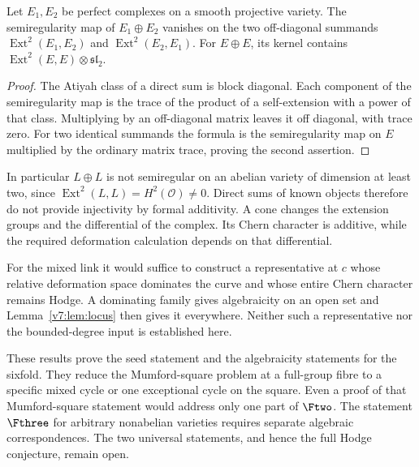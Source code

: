 \begin{lemma}\label{v7:lem:directsum}
Let \(E_1,E_2\) be perfect complexes on a smooth projective variety. The semiregularity map of \(E_1\oplus E_2\) vanishes on the two off-diagonal summands
\(\operatorname{Ext}^2(E_1,E_2)\) and \(\operatorname{Ext}^2(E_2,E_1)\).
For \(E\oplus E\), its kernel contains
\(\operatorname{Ext}^2(E,E)\otimes\mathfrak{sl}_2\).
\end{lemma}
\begin{proof}
The Atiyah class of a direct sum is block diagonal. Each component of the semiregularity map is the trace of the product of a self-extension with a power of that class. Multiplying by an off-diagonal matrix leaves it off diagonal, with trace zero. For two identical summands the formula is the semiregularity map on \(E\) multiplied by the ordinary matrix trace, proving the second assertion.
\end{proof}

In particular \(L\oplus L\) is not semiregular on an abelian variety of dimension at least two, since \(\operatorname{Ext}^2(L,L)=H^2(\mathcal O)\ne0\). Direct sums of known objects therefore do not provide injectivity by formal additivity. A cone changes the extension groups and the differential of the complex. Its Chern character is additive, while the required deformation calculation depends on that differential.

For the mixed link it would suffice to construct a representative at \(c\) whose relative deformation space dominates the curve and whose entire Chern character remains Hodge. A dominating family gives algebraicity on an open set and Lemma~\ref{v7:lem:locus} then gives it everywhere. Neither such a representative nor the bounded-degree input is established here.

These results prove the seed statement and the algebraicity statements for the sixfold. They reduce the Mumford-square problem at a full-group fibre to a specific mixed cycle or one exceptional cycle on the square. Even a proof of that Mumford-square statement would address only one part of \(\Ftwo\). The statement \(\Fthree\) for arbitrary nonabelian varieties requires separate algebraic correspondences. The two universal statements, and hence the full Hodge conjecture, remain open.
